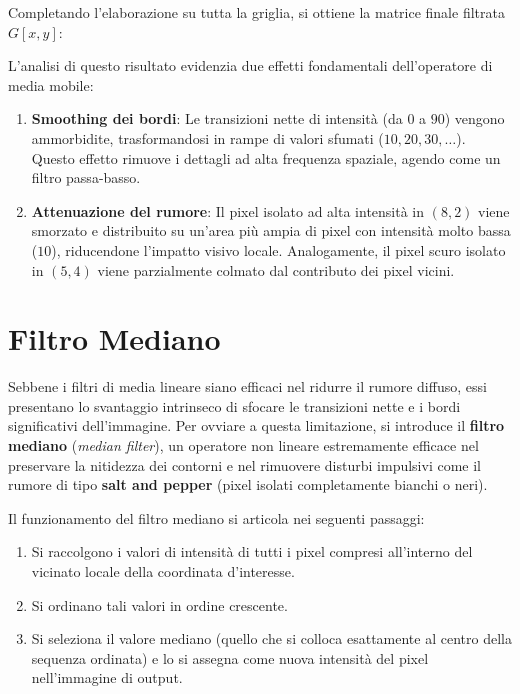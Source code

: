 ﻿\documentclass[11pt, a4paper]{article}
\begin{document}
Completando l'elaborazione su tutta la griglia, si ottiene la matrice finale filtrata $G[x,y]$:


L'analisi di questo risultato evidenzia due effetti fondamentali dell'operatore di media mobile:
\begin{enumerate}
    \item \textbf{Smoothing dei bordi}: Le transizioni nette di intensità (da $0$ a $90$) vengono ammorbidite, trasformandosi in rampe di valori sfumati ($10, 20, 30, \dots$). Questo effetto rimuove i dettagli ad alta frequenza spaziale, agendo come un filtro passa-basso.
    \item \textbf{Attenuazione del rumore}: Il pixel isolato ad alta intensità in $(8,2)$ viene smorzato e distribuito su un'area più ampia di pixel con intensità molto bassa ($10$), riducendone l'impatto visivo locale. Analogamente, il pixel scuro isolato in $(5,4)$ viene parzialmente colmato dal contributo dei pixel vicini.
\end{enumerate}


\newpage

\section{Filtro Mediano}

Sebbene i filtri di media lineare siano efficaci nel ridurre il rumore diffuso, essi presentano lo svantaggio intrinseco di sfocare le transizioni nette e i bordi significativi dell'immagine. Per ovviare a questa limitazione, si introduce il \textbf{filtro mediano} (\emph{median filter}), un operatore non lineare estremamente efficace nel preservare la nitidezza dei contorni e nel rimuovere disturbi impulsivi come il rumore di tipo \textbf{salt and pepper} (pixel isolati completamente bianchi o neri).

Il funzionamento del filtro mediano si articola nei seguenti passaggi:
\begin{enumerate}
    \item Si raccolgono i valori di intensità di tutti i pixel compresi all'interno del vicinato locale della coordinata d'interesse.
    \item Si ordinano tali valori in ordine crescente.
    \item Si seleziona il valore mediano (quello che si colloca esattamente al centro della sequenza ordinata) e lo si assegna come nuova intensità del pixel nell'immagine di output.
\end{enumerate}
\end{document}

